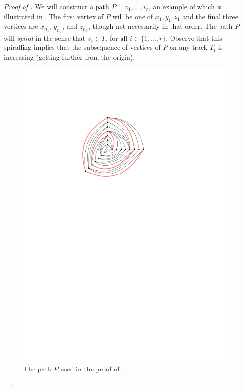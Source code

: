 \documentclass{patmorin}
\begin{document}
\begin{proof}[Proof of ]
  We will construct a path $P=v_1,\ldots,v_r$, an example of which is illustrated in . The first vertex of $P$ will be one of  
  $x_1,y_1,z_1$ and the final three vertices are $x_{n_1}$,
  $y_{n_2}$, and $z_{n_3}$, though not necessarily in that order.
  The path $P$ will \emph{spiral} in the sense that $v_i\in T_i$
  for all $i\in\{1,\ldots,r\}$.  Observe that this spiralling implies that the subsequence of vertices of $P$ on any track $T_i$ is increasing (getting further from the origin).

  \begin{figure}
     \begin{center}
        \includegraphics{figs/graph-2}
     \end{center}
     \caption{The path $P$ used in the proof of .}
  \end{figure}


\end{proof}
\end{document}
